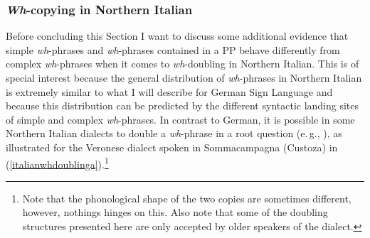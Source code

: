 %
%
%
%
%


\subsubsection{\textit{Wh}-copying in Northern Italian}
Before concluding this Section I want to discuss some additional evidence that simple \textit{wh}-phrases and \textit{wh}-phrases contained in a PP behave differently from complex \textit{wh}-phrases when it comes to \textit{wh}-doubling in Northern Italian. This is of special interest because the general distribution of \textit{wh}-phrases in Northern Italian is extremely similar to what I will describe for German Sign Language and because this distribution can be predicted by the different syntactic landing sites of simple and complex \textit{wh}-phrases. In contrast to German, it is possible in some Northern Italian dialects to double a \textit{wh}-phrase in a root question (e.\,g., \citealt{poletto2005wh, munaro2005quest}), as illustrated for the Veronese dialect spoken in Sommacampagna (Custoza) in (\ref{italianwhdoublinga}).\footnote{ Note that the phonological shape of the two copies are sometimes different, however, nothings hinges on this. Also note that some of the doubling structures presented here are only accepted by older speakers of the dialect.}

